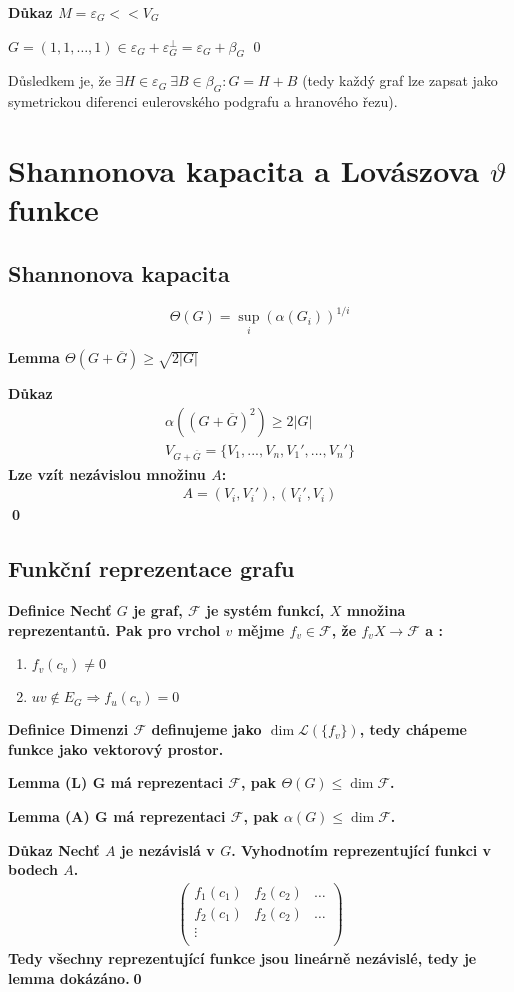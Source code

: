 \documentclass[a4paper,12pt,titlepage]{article}
\newcommand{\shn}{\Theta}
\newcommand{\lm}{\smallskip\noindent\bf Lemma\rm{} }
\newcommand{\dk}{\smallskip\noindent\bf Důkaz\rm{} }
\newcommand{\df}{\smallskip\noindent\bf Definice\rm{} }
\newcommand{\F}{\mathcal{F}}
\renewcommand{\L}{\mathcal{L}}
\renewcommand{\L}{\mathcal{L}}
\begin{document}
\dk $M = \varepsilon_G << V_G$

$G = (1,1,\dots,1) \in \varepsilon_G + \varepsilon_G^\bot = \varepsilon_G + \beta_G$
\qed

Důsledkem je, že $\exists H \in \varepsilon_G\ \exists B\in \beta_G: G = H + B$ (tedy každý graf lze zapsat jako symetrickou diferenci eulerovského podgrafu a hranového řezu).


\section{Shannonova kapacita a Lovászova $\vartheta$ funkce}
\subsection{Shannonova kapacita}
$$
	\shn(G) = \sup_i(\alpha(G_i))^{1/i}
$$

\lm $\shn(G + \overline{G}) \geq \sqrt{2|G|}$

\dk 
\begin{align}
	\alpha ((G+\overline G)^2) \geq 2|G| \\
	V_{G+\overline G} = \{ V_1, ..., V_n, V_1', ..., V_n'\}
\end{align}
Lze vzít nezávislou množinu $A$:
\begin{align}
	A = (V_i, V_i'), (V_i', V_i)
\end{align}
\qed


\subsection{Funkční reprezentace grafu}
\df Nechť $G$ je graf, $\F$ je systém funkcí, $X$ množina reprezentantů. Pak pro vrchol $v$ mějme $f_v \in \F$, že $f_v X \to \F$ a :
\begin{enumerate}
	\item $f_v(c_v) \neq 0$
	\item $uv \notin E_G \Rightarrow f_u(c_v) = 0$
\end{enumerate}

\df Dimenzi $\F$ definujeme jako $\dim\L(\{f_v\})$, tedy chápeme funkce jako vektorový prostor.


\lm(L) G má reprezentaci $\F$, pak $\shn(G) \leq \dim \F$.

\lm(A) G má reprezentaci $\F$, pak $\alpha(G) \leq \dim \F$.\par
\dk Nechť $A$ je nezávislá v $G$. Vyhodnotím reprezentující funkci v bodech $A$.
\begin{align}
\left(
	\begin{matrix}
		f_1(c_1) & f_2(c_2) & \dots \\
		f_2(c_1) & f_2(c_2) & \dots \\
		\vdots &&\\
	\end{matrix}\right)
\end{align}
Tedy všechny reprezentující funkce jsou lineárně nezávislé, tedy je lemma dokázáno.\qed
\end{document}

